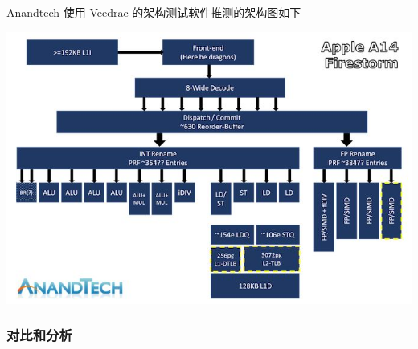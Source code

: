 \documentclass[a4paper]{article}
\begin{document}
Anandtech 使用 Veedrac 的架构测试软件推测的架构图如下

\includegraphics[width=\textwidth]{arch.jpg}

\subsubsection{对比和分析}
\end{document}
